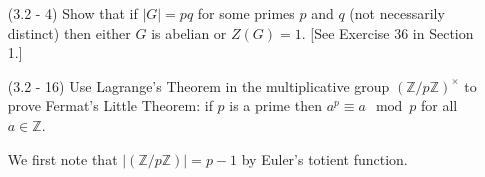 \documentclass[12pt]{article}
\begin{document}
\begin{enumerate}
\begin{enumerate}
\end{enumerate}


\item[(3.2 - 4)] Show that if $|G|=pq$ for some primes
$p$ and $q$ (not necessarily distinct) then either
$G$ is abelian or $Z(G) = 1$. [See Exercise 36 in Section 1.]
\begin{mybox}
    
\end{mybox}


\item[(3.2 - 16)] Use Lagrange's Theorem in the multiplicative group $(\mathbb{Z}
/p\mathbb{Z})^\times$ to prove Fermat's Little Theorem:
if $p$ is a prime then $a^p \equiv a\mod{p}$ for all $a\in\mathbb{Z}$.
\begin{mybox}
    
    We first note that
    $|(\mathbb{Z}/p\mathbb{Z})|=p-1$ by Euler's totient
    function.
\end{mybox}
\end{enumerate}
\end{document}
